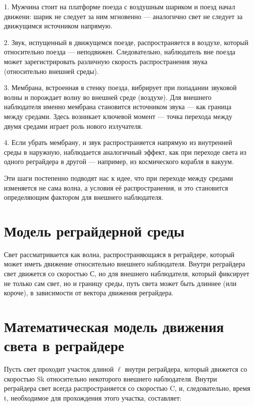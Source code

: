 \documentclass[12pt]{article}
\begin{document}
\par
1. Мужчина стоит на платформе поезда с воздушным шариком и поезд начал движени: шарик не следует за ним мгновенно — аналогично свет не следует за движущимся источником напрямую.
\par
2. Звук, испущенный в движущемся поезде, распространяется в воздухе, который относительно поезда — неподвижен. Следовательно, наблюдатель вне поезда может зарегистрировать различную скорость распространения звука (относительно внешней среды).
\par
3. Мембрана, встроенная в стенку поезда, вибрирует при попадании звуковой волны и порождает волну во внешней среде (воздухе). Для внешнего наблюдателя именно мембрана становится источником звука — как граница между средами. Здесь возникает ключевой момент — точка перехода между двумя средами играет роль нового излучателя.
\par
4. Если убрать мембрану, и звук распространяется напрямую из внутренней среды в наружную, наблюдается аналогичный эффект, как при переходе света из одного реграйдера в другой — например, из космического корабля в вакуум.
\par
Эти шаги постепенно подводят нас к идее, что при переходе между средами изменяется не сама волна, а условия её распространения, и это становится определяющим фактором для внешнего наблюдателя.


\section*{Модель реграйдерной среды}

Свет рассматривается как волна, распространяющаяся в реграйдере, который может иметь движение относительно внешнего наблюдателя. Внутри реграйдера свет движется со скоростью С, но для внешнего наблюдателя, который фиксирует не только сам свет, но и границу среды, путь света может быть длиннее (или короче), в зависимости от вектора движения реграйдера.

\section*{Математическая модель движения света в реграйдере}

Пусть свет проходит участок длиной $\ell$ внутри реграйдера, который движется со скоростью Sk относительно некоторого внешнего наблюдателя. Внутри реграйдера свет всегда распространяется со скоростью C, и, следовательно, время t, необходимое для прохождения этого участка, составляет:
\end{document}
